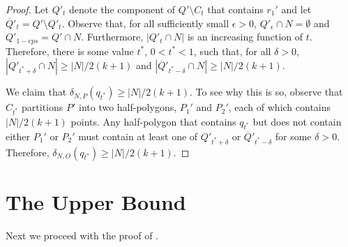 \documentclass{article}
\newcommand{\eps}{\epsilon}
\begin{document}
\begin{proof}
Let $Q'_t$ denote the component of $Q'\setminus C_t$ that contains
$r_1'$ and let $\overline{Q}'_t = Q'\setminus Q'_t$.
Observe that, for all sufficiently small $\epsilon > 0$, $Q'_\eps\cap
N=\emptyset$ and $Q'_{1-eps} = Q'\cap N$.  Furthermore, $|Q'_t\cap N|$
is an increasing function of $t$.
Therefore, there is some value $t^*$, $0 < t^* < 1$, such that, for
all $\delta > 0$, 
$|Q'_{t^*+\delta}\cap N|\ge |N|/2(k+1)$ and 
$|\overline{Q}'_{t^*-\delta}\cap N|\ge |N|/2(k+1)$.

We claim that $\delta_{N,P}(q_{t^*}) \ge |N|/2(k+1)$.   To see
why this is so, observe that $C_{t^*}$ partitions $P'$ into two
half-polygons, $P_1'$ and $P_2'$, each of which contains $|N|/2(k+1)$
points.  Any half-polygon that contains $q_{t^*}$ but does not contain
either $P_1'$ or $P_2'$ must contain at least one of 
$Q'_{t^*+\delta}$ or 
$\overline{Q}'_{t^*-\delta}$ for some $\delta > 0$.
Therefore, $\delta_{N,O}(q_{t^*}) \ge |N|/2(k+1)$.
\end{proof}

\section{The Upper Bound}

Next we proceed with the proof of .
\end{document}
